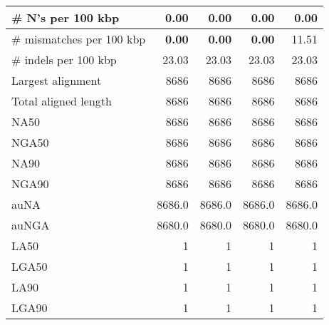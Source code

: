 \documentclass[12pt,a4paper]{article}
\begin{document}
\begin{table}[ht]
\begin{center}
\begin{tabular}{|l*{4}{|r}|}
\# N's per 100 kbp & 0.00 & 0.00 & 0.00 & 0.00 \\ \hline
\# mismatches per 100 kbp & {\bf 0.00} & {\bf 0.00} & {\bf 0.00} & 11.51 \\ \hline
\# indels per 100 kbp & 23.03 & 23.03 & 23.03 & 23.03 \\ \hline
Largest alignment & 8686 & 8686 & 8686 & 8686 \\ \hline
Total aligned length & 8686 & 8686 & 8686 & 8686 \\ \hline
NA50 & 8686 & 8686 & 8686 & 8686 \\ \hline
NGA50 & 8686 & 8686 & 8686 & 8686 \\ \hline
NA90 & 8686 & 8686 & 8686 & 8686 \\ \hline
NGA90 & 8686 & 8686 & 8686 & 8686 \\ \hline
auNA & 8686.0 & 8686.0 & 8686.0 & 8686.0 \\ \hline
auNGA & 8680.0 & 8680.0 & 8680.0 & 8680.0 \\ \hline
LA50 & 1 & 1 & 1 & 1 \\ \hline
LGA50 & 1 & 1 & 1 & 1 \\ \hline
LA90 & 1 & 1 & 1 & 1 \\ \hline
LGA90 & 1 & 1 & 1 & 1 \\ \hline
\end{tabular}
\end{center}
\end{table}
\end{document}
